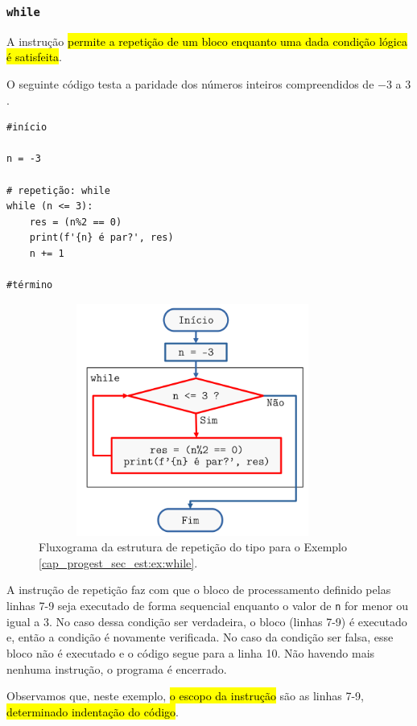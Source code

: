 \subsubsection{\texttt{while}}

A instrução \hl{{\PYTHONwhile} permite a repetição de um bloco enquanto uma dada condição lógica é satisfeita}.

\begin{ex}\label{cap_progest_sec_est:ex:while}
  O seguinte código testa a paridade dos números inteiros compreendidos de $-3$ a $3$.

\begin{lstlisting}
#início

n = -3

# repetição: while
while (n <= 3):
    res = (n%2 == 0)
    print(f'{n} é par?', res)
    n += 1
    
#término
\end{lstlisting}

\begin{figure}[ht]
  \centering
  \includegraphics[max width=0.9\textwidth, max height=3in]{./cap_progest/dados/fig_fg_while_ex/fig.png}
  \caption{Fluxograma da estrutura de repetição do tipo {\PYTHONwhile} para o Exemplo \ref{cap_progest_sec_est:ex:while}.}
  \label{cap_progest_sec_est:fig:fg_while_ex}
\end{figure}


A instrução de repetição {\PYTHONwhile} faz com que o bloco de processamento definido pelas linhas 7-9 seja executado de forma sequencial enquanto o valor de \lstinline+n+ for menor ou igual a 3. No caso dessa condição ser verdadeira, o bloco (linhas 7-9) é executado e, então a condição é novamente verificada. No caso da condição ser falsa, esse bloco não é executado e o código segue para a linha 10. Não havendo mais nenhuma instrução, o programa é encerrado.

Observamos que, neste exemplo, \hl{o escopo da instrução {\PYTHONwhile}} são as linhas 7-9, \hl{determinado indentação do código}.
\end{ex}

